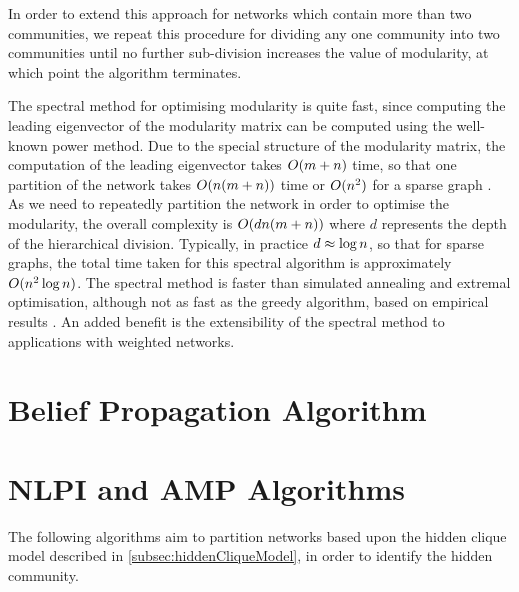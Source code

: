 In order to extend this approach for networks which contain more than two communities, we repeat this procedure for dividing any one community into two communities until no further sub-division increases the value of modularity, at which point the algorithm terminates.

The spectral method for optimising modularity is quite fast, since computing the leading eigenvector of the modularity matrix can be computed using the well-known power method.
Due to the special structure of the modularity matrix, the computation of the leading eigenvector takes $O(m+n)$ time, so that one partition of the network takes $O(n(m+n))$ time or $O(n^{2})$ for a sparse graph \cite{For10}.
As we need to repeatedly partition the network in order to optimise the modularity, the overall complexity is $O(dn(m+n))$ where $d$ represents the depth of the hierarchical division.
Typically, in practice $d \approx \log n$, so that for sparse graphs, the total time taken for this spectral algorithm is approximately $O(n^{2}\log n)$.
The spectral method is faster than simulated annealing and extremal optimisation, although not as fast as the greedy algorithm, based on empirical results \cite{For10}.
An added benefit is the extensibility of the spectral method to applications with weighted networks.


\section{Belief Propagation Algorithm}
\label{sec:beliefPropagationAlgorithm}



\section{NLPI and AMP Algorithms}
\label{sec:NLPIAndAMPAlgorithmsCommunityDetection}

The following algorithms aim to partition networks based upon the hidden clique model described in \cref{subsec:hiddenCliqueModel}, in order to identify the hidden community.


